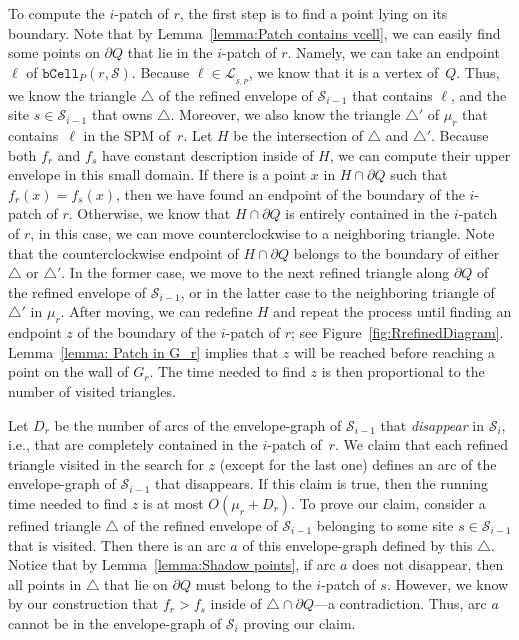 \documentclass[a4paper, 11pt]{article}
\newcommand{\icell}[1][i]{${#1}$-patch\xspace}
\newcommand{\s}{\mathcal S}
\newcommand{\bcell}[2][P]{\ensuremath{\mathtt{bCell}_{\scriptscriptstyle #1}(#2)}}
\newcommand{\LL}[1][\s, P]{\ensuremath{\mathcal L_{_{#1}}}}
\begin{document}
To compute the \icell of $r$, the first step is to find a point lying on its boundary.
Note that by Lemma~\ref{lemma:Patch contains vcell}, we can easily find some points on $\partial Q$ that lie in the \icell of $r$.
Namely, we can take an endpoint $\ell$ of $\bcell{r, \s}$. 
Because $\ell\in \LL$, we know that it is a vertex of~$Q$.
Thus, we know the triangle $\triangle$ of the refined envelope of $\s_{i-1}$ that contains $\ell$, and the site $s\in \s_{i-1}$ that owns $\triangle$.
Moreover, we also know the triangle $\triangle'$ of $\mu_r$ that contains~$\ell$ in the SPM of~$r$.
Let $H$ be the intersection of $\triangle$ and $\triangle'$.
Because both $f_r$ and $f_s$ have constant description inside of $H$, we can compute their upper envelope in this small domain.
If there is a point $x$ in $H\cap \partial Q$ such that $f_r(x) = f_s(x)$, then we have found an endpoint of the boundary of the \icell of $r$.
Otherwise, we know that $H\cap \partial Q$ is entirely contained in the \icell of $r$, in this case, we can move counterclockwise to a neighboring triangle.
Note that the counterclockwise endpoint of $H\cap \partial Q$ belongs to the boundary of either $\triangle$ or $\triangle'$. 
In the former case, we move to the next refined triangle along $\partial Q$ of the refined envelope of $\s_{i-1}$, 
or in the latter case to the neighboring triangle of $\triangle'$ in $\mu_r$.
After moving, we can redefine $H$ and repeat the process until finding an endpoint $z$ of the boundary of the \icell of $r$; see Figure~\ref{fig:RrefinedDiagram}. 
Lemma~\ref{lemma: Patch in G_r} implies that $z$ will be reached before reaching a point on the wall of $G_r$.
The time needed to find $z$ is then proportional to the number of visited triangles. 

Let $D_r$ be the number of arcs of the envelope-graph of $\s_{i-1}$ that \emph{disappear} in $\s_i$, i.e., that are completely contained in the \icell of~$r$.
We claim that each refined triangle visited in the search for $z$ (except for the last one) defines an arc of  the  envelope-graph of $\s_{i-1}$ that disappears. 
If this claim is true, then the running time needed to find $z$ is at most $O(\mu_r + D_r)$.
To prove our claim, consider a refined triangle $\triangle$ of the refined envelope of $\s_{i-1}$ belonging to some site $s\in \s_{i-1}$ that is visited. 
Then there is an arc $a$ of this envelope-graph defined by this $\triangle$. 
Notice that by Lemma~\ref{lemma:Shadow points}, if arc $a$ does not disappear, then all points in $\triangle$ that lie on $\partial Q$ must belong to the \icell of $s$. 
However, we know by our construction that $f_r > f_s$ inside of $\triangle\cap \partial Q$---a contradiction. 
Thus, arc $a$ cannot be in the envelope-graph of $\s_i$ proving our claim. 
\end{document}
